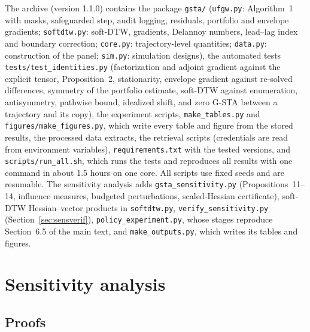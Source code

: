 \documentclass[12pt]{article}
\begin{document}
The archive (version 1.1.0) contains the package \texttt{gsta/} (\texttt{ufgw.py}: Algorithm~1 with masks, safeguarded step, audit logging, residuals, portfolio and envelope gradients; \texttt{softdtw.py}: soft-DTW, gradients, Delannoy numbers, lead--lag index and boundary correction; \texttt{core.py}: trajectory-level quantities; \texttt{data.py}: construction of the panel; \texttt{sim.py}: simulation designs), the automated tests \texttt{tests/test\_identities.py} (factorization and adjoint gradient against the explicit tensor, Proposition~2, stationarity, envelope gradient against re-solved differences, symmetry of the portfolio estimate, soft-DTW against enumeration, antisymmetry, pathwise bound, idealized shift, and zero G-STA between a trajectory and its copy), the experiment scripts, \texttt{make\_tables.py} and \texttt{figures/make\_figures.py}, which write every table and figure from the stored results, the processed data extracts, the retrieval scripts (credentials are read from environment variables), \texttt{requirements.txt} with the tested versions, and \texttt{scripts/run\_all.sh}, which runs the tests and reproduces all results with one command in about 1.5 hours on one core. All scripts use fixed seeds and are resumable. The sensitivity analysis adds \texttt{gsta\_sensitivity.py} (Propositions~11--14, influence measures, budgeted perturbations, scaled-Hessian certificate), soft-DTW Hessian--vector products in \texttt{softdtw.py}, \texttt{verify\_sensitivity.py} (Section~\ref{sec:sensverif}), \texttt{policy\_experiment.py}, whose stages reproduce Section~6.5 of the main text, and \texttt{make\_outputs.py}, which writes its tables and figures.

\section{Sensitivity analysis}\label{sec:sens}

\subsection{Proofs}
\end{document}
